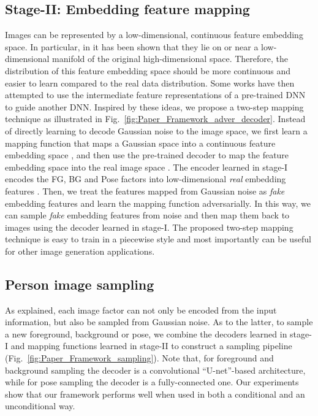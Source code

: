 \documentclass[10pt,twocolumn,letterpaper]{article}
\begin{document}
\subsection{Stage-\RN{2}: Embedding feature mapping}
Images can be represented by a low-dimensional, continuous feature embedding space. 
In particular, in \cite{semidefinite_Manifold, LLE_Manifold, LCC, dollar2007learning} it has been shown that they lie on or near a low-dimensional manifold of the original high-dimensional space. 
Therefore, the distribution of this feature embedding space should be more continuous and easier to learn compared to the real data distribution. 
Some works \cite{Zhang-stackGAN, gupta2016cross, romero2014fitnets} have then attempted to use the intermediate feature representations of a pre-trained DNN to guide another DNN.
Inspired by these ideas, we propose a two-step mapping technique as illustrated in Fig.~\ref{fig:Paper_Framework_adver_decoder}. 
Instead of directly learning to decode Gaussian noise to the image space, we first learn a mapping function  that maps a Gaussian space  into a continuous feature embedding space , and then use the pre-trained decoder to map the feature embedding space  into the real image space . 
The encoder learned in stage-\RN{1} encodes the FG, BG and Pose factors  into low-dimensional {\it real} embedding features . 
Then, we treat the features mapped from Gaussian noise  as {\it fake} embedding features  and learn the mapping function  adversarially. 
In this way, we can sample {\it fake} embedding features from noise and then map them back to images using the decoder learned in stage-\RN{1}.
The proposed two-step mapping technique is easy to train in a piecewise style and most importantly can be useful for other image generation applications.

\subsection{Person image sampling}
As explained, each image factor can not only be encoded from the input information, but also be sampled from Gaussian noise.
As to the latter, to sample a new foreground, background or pose, we combine the decoders learned in stage-\RN{1} and mapping functions learned in stage-\RN{2} to construct a  sampling pipeline (Fig.~\ref{fig:Paper_Framework_sampling}). 
Note that, for foreground and background sampling the decoder is a convolutional ``U-net''-based architecture, while for pose sampling the decoder is a fully-connected one.
Our experiments show that our framework performs well when used in both a conditional and an unconditional way.
\end{document}
